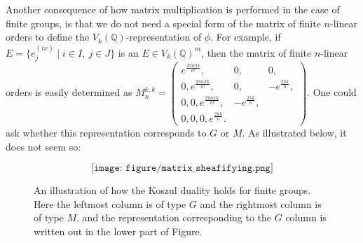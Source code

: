 \documentclass[a4paper,reqno,oneside]{article}
\begin{document}
Another consequence of how matrix multiplication is performed in the case of finite groups, is that we do not need a special form of the matrix of finite $n$-linear orders to define the $V_k(\mathbb{Q})$-representation of $\phi$. For example, if $E = \{ e^{(ix)}_{j} \mid i \in I,\ j \in J\}$ is an $E \in V_k(\mathbb{Q})^m$, then the matrix of finite $n$-linear orders is easily determined as $M_{n}^{k, k} = \begin{pmatrix}
e^{\frac{2\pi n \pi k}{n!}}, & 0, &  0,\\
0, e^{\frac{2\pi n \pi k}{n!}}, & 0, & -e^{\frac{2\pi k}{n}},\\
0, 0, e^{\frac{2\pi n \pi k}{n!}}, & -e^{\frac{2\pi k}{n}}, \\
0, 0, 0, e^{\frac{2\pi k}{n}}.
\end{pmatrix}$. One could ask whether this representation corresponds to $G$ or $M$. As illustrated below, it does not seem so:
\begin{figure}[ht]
\[
\texttt{[image: figure/matrix\_sheafifying.png]}
\]
\caption{An illustration of how the Koszul duality holds for finite groups. Here the leftmost column is of type $G$ and the rightmost column is of type $M$, and the representation corresponding to the $G$ column is written out in the lower part of Figure. } 
\label{fig:matrix_sheafifying}
\end{figure}
\end{document}
